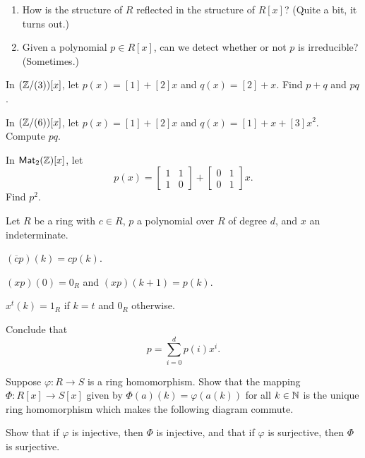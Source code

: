 \begin{framed}
\begin{enumerate}
\item How is the structure of \(R\) reflected in the structure of \(R[x]\)? (Quite a bit, it turns out.)
\item Given a polynomial \(p \in R[x]\), can we detect whether or not \(p\) is irreducible? (Sometimes.)
\end{enumerate}
\end{framed}



\Exercises%

\begin{exercise}
\begin{proplist}
\item In \((\mathbb{Z}/(3))[x]\), let \(p(x) = [1] + [2]x\) and \(q(x) = [2] + x\).
Find \(p+q\) and \(pq\).
\item In \((\mathbb{Z}/(6))[x]\), let \(p(x) = [1] + [2]x\) and \(q(x) = [1] + x + [3]x^2\).
Compute \(pq\).\item In \(\mathsf{Mat}_{2}(\mathbb{Z})[x]\), let \[ p(x) = \begin{bmatrix} 1 & 1 \\ 1 & 0 \end{bmatrix} + \begin{bmatrix} 0 & 1 \\ 0 & 1 \end{bmatrix} x. \]
Find \(p^2\).
\end{proplist}
\end{exercise}

\begin{exercise} \label{exerc:poly-expand}
Let \(R\) be a ring with \(c \in R\), \(p\) a polynomial over \(R\) of degree \(d\), and \(x\) an indeterminate.
\begin{proplist}
\item \((\overline{c}p)(k) = cp(k)\).
\item \((xp)(0) = 0_R\) and \((xp)(k+1) = p(k)\).
\item \(x^t(k) = 1_R\) if \(k = t\) and \(0_R\) otherwise.
\item Conclude that \[ p = \sum_{i=0}^d p(i)x^i. \]
\end{proplist}
\end{exercise}

\begin{exercise}
Suppose \(\varphi : R \rightarrow S\) is a ring homomorphism.
Show that the mapping \(\Phi : R[x] \rightarrow S[x]\) given by \(\Phi(a)(k) = \varphi(a(k))\) for all \(k \in \mathbb{N}\) is the unique ring homomorphism which makes the following diagram commute.
\begin{center}
\end{center}
Show that if \(\varphi\) is injective, then \(\Phi\) is injective, and that if \(\varphi\) is surjective, then \(\Phi\) is surjective.
\end{exercise}

